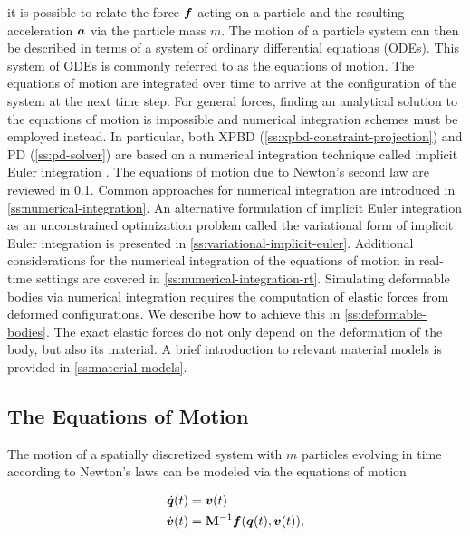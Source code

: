 \noindent it is possible to relate the force $\bm{f}$ acting on a particle and the resulting acceleration $\bm{a}$ via the particle
mass $m$. The motion of a particle system can then be described in terms of a system of ordinary differential equations (ODEs). This
system of ODEs is commonly referred to as the equations of motion. The equations of motion are integrated over time to arrive 
at the configuration of the system at the next time step. For general forces, finding an analytical solution to the equations of motion
is impossible and numerical integration schemes must be employed instead. In particular, both XPBD (\cref{ss:xpbd-constraint-projection}) 
and PD (\cref{ss:pd-solver}) are based on a numerical 
integration technique called implicit Euler integration \cite{macklin2016, bouaziz2014}. The equations of motion due to Newton's second 
law are reviewed in \cref{s:equations-of-motion}. Common approaches for numerical integration are introduced in 
\cref{ss:numerical-integration}. An alternative formulation of implicit Euler integration as an unconstrained optimization problem
called the variational form of implicit Euler integration is presented in \cref{ss:variational-implicit-euler}. Additional 
considerations for the numerical integration of the equations of motion in real-time settings are covered in 
\cref{ss:numerical-integration-rt}. Simulating deformable bodies via numerical integration requires the computation of elastic forces from 
deformed configurations. We describe how to achieve this in \autoref{ss:deformable-bodies}. The exact elastic forces do not only depend on 
the deformation of the body, but also its material. A brief introduction to relevant material models is provided in 
\autoref{ss:material-models}.

\subsection{The Equations of Motion}\label{s:equations-of-motion}

The motion of a spatially discretized system with $m$ particles evolving in time according to Newton's laws can be modeled via 
the equations of motion

\begin{align}
    \begin{split}\label{eq:equations-of-motion}
        \dot{\bm{q}}(t) &= \bm{v}(t) \\
        \dot{\bm{v}}(t) &= \mathbf{M}^{-1}\bm{f}(\bm{q}(t), \bm{v}(t)),
    \end{split}
\end{align}

